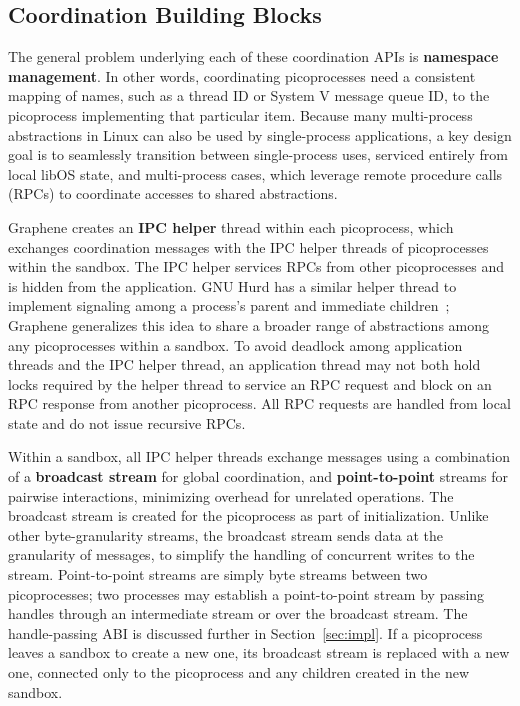 \subsection{Coordination Building Blocks}
\label{sec:namespaces:blocks}

The general problem underlying each of these coordination APIs is 
{\bf namespace management}.  In other words, coordinating picoprocesses need 
a consistent mapping of names, such as a thread ID or System V message queue ID, 
to the picoprocess implementing that particular item.  
Because many multi-process abstractions in Linux can also be used by single-process applications,
a key design goal is to seamlessly transition between single-process uses, serviced 
entirely from local libOS state, and multi-process cases, which
leverage remote procedure calls (RPCs) to coordinate accesses to shared abstractions.


Graphene creates an  {\bf IPC helper} thread within each picoprocess,
which exchanges coordination messages with the IPC helper threads of picoprocesses 
within the sandbox. %
The IPC helper
services RPCs from other picoprocesses and is
hidden from the application. 
GNU Hurd has a similar helper thread to implement signaling among a process's parent and
immediate children~\citep{hurd};
Graphene generalizes this idea to share a broader range of abstractions among any picoprocesses
within a sandbox.
To avoid deadlock among application threads and the IPC helper thread, 
an application thread may not both hold locks required by the helper thread to service an RPC request
and block
on an RPC response from another picoprocess.
All RPC requests are handled from local state and do not issue recursive RPCs.%

Within a sandbox, all IPC helper threads exchange messages using a
combination of a {\bf broadcast stream} for global coordination,
and {\bf point-to-point} streams for pairwise interactions, 
minimizing overhead for unrelated operations.
The broadcast stream is created for the picoprocess as part of initialization.
Unlike other byte-granularity streams, the broadcast stream sends data at the granularity of messages,
to simplify the handling of concurrent writes to the stream.
Point-to-point streams are simply byte streams between two picoprocesses;
two processes may establish a point-to-point stream by passing handles through 
an intermediate stream or over the broadcast stream.
The handle-passing ABI is discussed further in Section~\ref{sec:impl}.
If a picoprocess leaves a sandbox to create a new one,
its broadcast stream is replaced
with a new one, connected only to the picoprocess and any children created in the
new sandbox.

